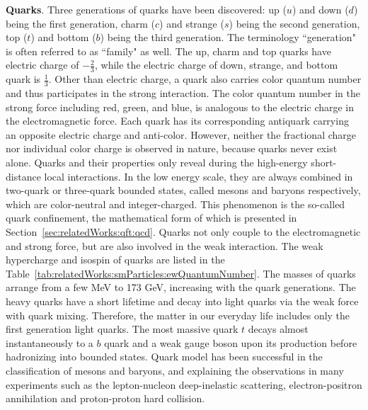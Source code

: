 \textbf{Quarks}. Three generations of quarks have been discovered: up ($u$) and down ($d$) being the first generation, charm ($c$) and strange ($s$) being the second generation, top ($t$) and bottom ($b$) being the third generation. The terminology ``generation" is often referred to as ``family" as well. The up, charm and top quarks have electric charge of $-\frac{2}{3}$, while the electric charge of down, strange, and bottom quark is $\frac{1}{3}$. Other than electric charge, a quark also carries color quantum number and thus participates in the strong interaction. The color quantum number in the strong force including red, green, and blue, is analogous to the electric charge in the electromagnetic force. Each quark has its corresponding antiquark carrying an opposite electric charge and anti-color. However, neither the fractional charge nor individual color charge is observed in nature, because quarks never exist alone. Quarks and their properties only reveal during the high-energy short-distance local interactions. In the low energy scale, they are always combined in two-quark or three-quark bounded states, called mesons and baryons respectively, which are color-neutral and integer-charged. This phenomenon is the so-called quark confinement, the mathematical form of which is presented in Section~\ref{sec:relatedWorks:qft:qcd}. Quarks not only couple to the electromagnetic and strong force, but are also involved in the weak interaction. The weak hypercharge and isospin of quarks are listed in the Table~\ref{tab:relatedWorks:smParticles:ewQuantumNumber}. The masses of quarks arrange from a few MeV to 173 GeV, increasing with the quark generations. The heavy quarks have a short lifetime and decay into light quarks via the weak force with quark mixing. Therefore, the matter in our everyday life includes only the first generation light quarks. The most massive quark $t$ decays almost instantaneously to a $b$ quark and a weak gauge boson upon its production before hadronizing into bounded states. Quark model has been successful in the classification of mesons and baryons, and explaining the observations in many experiments such as the lepton-nucleon deep-inelastic scattering, electron-positron annihilation and proton-proton hard collision.



